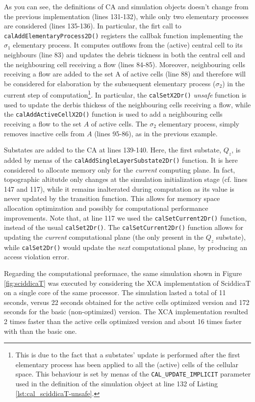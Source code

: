 As you can see, the definitions of CA and simulation objects doesn't
change from the previous implementation (lines 131-132), while only
two elementary processes are considered (lines 135-136). In
particular, the firt call to \verb'calAddElementaryProcess2D()'
registers the callbak function implementing the $\sigma_1$ elementary
process. It computes outflows from the (active) central cell to its
neighbours (line 83) and updates the debris tickness in both the
central cell and the neighbouring cell receiving a flow (lines
84-85). Moreover, neighbouring cells receiving a flow are added to the
set A of active cells (line 88) and therefore will be considered for
elaboration by the subsuequent elementary process ($\sigma_2$) in the
current step of computation\footnote{This is due to the fact that a
  substates' update is performed after the first elementary process
  has been applied to all the (active) cells of the cellular
  space. This behaviour is set by menas of the
  \texttt{CAL\_UPDATE\_IMPLICIT} parameter used in the definition of
  the simulation object at line 132 of Listing
  \ref{lst:cal_sciddicaT-unsafe}.}. In particular, the
\verb'calSetX2Dr()' \emph{unsafe} function is used to update the
derbis thickess of the neighbouring cells receiving a flow, while the
\verb'calAddActiveCellX2D()' function is used to add a neighbouring
cells receiving a flow to the set $A$ of active cells.  The $\sigma_2$
elementary process, simply removes inactive cells from $A$ (lines
95-86), as in the previous example.


Substates are added to the CA at lines 139-140. Here, the first
substate, $Q_z$, is added by menas of the
\verb'calAddSingleLayerSubstate2Dr()' function. It is here considered
to allocate memory only for the \emph{current} computing plane. In
fact, topographic altitutde only changes at the simulation
initialization stage (cf. lines 147 and 117), while it remains
inalterated during computation as its value is never updated by the
transition function. This allows for memory space allocation
optimization and possibly for computational performance
improvements. Note that, at line 117 we used the
\verb'calSetCurrent2Dr()' function, instead of the usual
\verb'calSet2Dr()'. The \verb'calSetCurrent2Dr()' function allows for
updating the \emph{current} computational plane (the only present in
the $Q_z$ substate), while \verb'calSet2Dr()' would update the
\emph{next} computational plane, by producing an access violation
error.

Regarding the computational preformace, the same simulation shown in
Figure \ref{fig:sciddicaT} was executed by considering the XCA
implementation of SciddicaT on a single core of the same
processor. The simulation lasted a total of 11 seconds, versus 22
seconds obtained for the active cells optimized version and 172
seconds for the basic (non-optimized) version. The XCA implementation resulted 2 times
faster than the active cells optimized version and about 16 times faster with
than the basic one.



